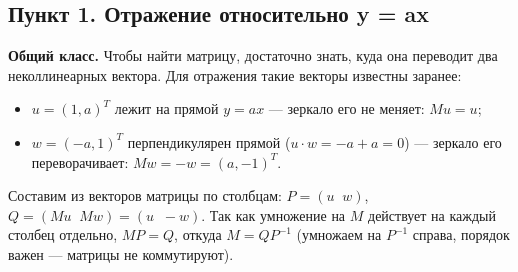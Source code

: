 \documentclass[a4paper,14pt]{extarticle}
\providecommand{\tightlist}{\setlength{\itemsep}{0pt}\setlength{\parskip}{0pt}}
\begin{document}
\hypertarget{ux43fux443ux43dux43aux442-1.-ux43eux442ux440ux430ux436ux435ux43dux438ux435-ux43eux442ux43dux43eux441ux438ux442ux435ux43bux44cux43dux43e-y-ax}{%
\subsection{Пункт 1. Отражение относительно y =
ax}\label{ux43fux443ux43dux43aux442-1.-ux43eux442ux440ux430ux436ux435ux43dux438ux435-ux43eux442ux43dux43eux441ux438ux442ux435ux43bux44cux43dux43e-y-ax}}

\textbf{Общий класс.} Чтобы найти матрицу, достаточно знать, куда она
переводит два неколлинеарных вектора. Для отражения такие векторы
известны заранее:

\begin{itemize}
\tightlist
\item
  \(u = (1, a)^T\) лежит на прямой \(y = ax\) --- зеркало его не меняет:
  \(Mu = u\);
\item
  \(w = (-a, 1)^T\) перпендикулярен прямой (\(u \cdot w = -a + a = 0\))
  --- зеркало его переворачивает: \(Mw = -w = (a, -1)^T\).
\end{itemize}

Составим из векторов матрицы по столбцам: \(P = (u \;\; w)\),
\(Q = (Mu \;\; Mw) = (u \;\; -w)\). Так как умножение на \(M\) действует
на каждый столбец отдельно, \(MP = Q\), откуда \(M = QP^{-1}\) (умножаем
на \(P^{-1}\) справа, порядок важен --- матрицы не коммутируют).

\begin{center}\end{center}

\begin{center}\end{center}

\begin{center}\end{center}
\end{document}
